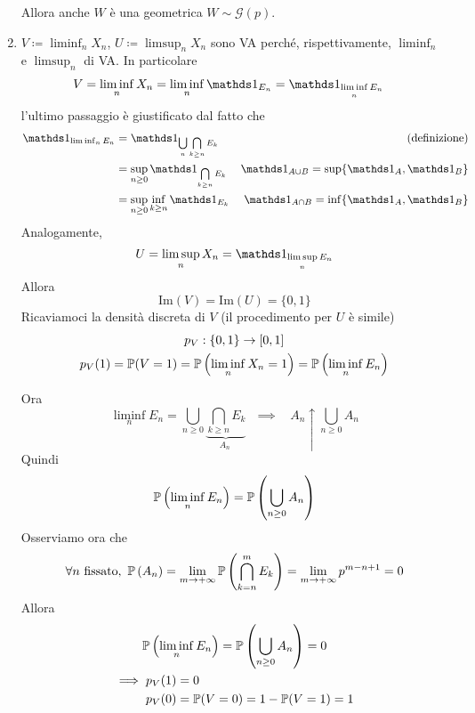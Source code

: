 \begin{enumerate}
Allora anche $W$ è una geometrica $W\sim \mathcal{G}( p)$.
\item $V\coloneqq \liminf _{n} X_{n}$, $U\coloneqq \limsup _{n} X_{n}$ sono VA perché, rispettivamente, $\liminf _{n}$ e $\limsup _{n}$ di VA. In particolare
\begin{align*}
V & =\liminf _{n} X_{n} =\liminf _{n}\Ind_{E_{n}} =\Ind_{\liminf\limits _{n} E_{n}}
\end{align*}
l'ultimo passaggio è giustificato dal fatto che
\begin{align*}
\Ind_{\liminf _{n} E_{n}} & =\Ind_{\bigcup\limits _{n}\bigcap\limits _{k\geq n} E_{k}} & \text{(definizione)}\\
 & =\sup\limits _{n\geq 0}\Ind_{\bigcap\limits _{k\geq n} E_{k}} & \Ind_{A\cup B} =\sup \{\Ind_{A} ,\Ind_{B}\}\\
 & =\sup _{n\geq 0}\inf_{k\geq n}\Ind_{E_{k}} & \Ind_{A\cap B} =\inf\{\Ind_{A} ,\Ind_{B}\}
\end{align*}
Analogamente,
\begin{equation*}
U=\limsup _{n} X_{n} =\Ind_{\limsup\limits _{n} E_{n}}
\end{equation*}
Allora
\begin{equation*}
\mathrm{Im}( V) =\mathrm{Im}( U) =\{0,1\}
\end{equation*}
Ricaviamoci la densità discreta di $V$ (il procedimento per $U$ è simile)
\begin{gather*}
p_{V} :\{0,1\}\rightarrow [ 0,1]\\
p_{V}( 1) =\mathbb{P}( V=1) =\mathbb{P}\left(\liminf _{n} X_{n} =1\right) =\mathbb{P}\left(\liminf _{n} E_{n}\right)
\end{gather*}

Ora
\begin{equation*}
\liminf _{n} E_{n} =\bigcup _{n\geq 0}\underbrace{\bigcap\limits _{k\geq n} E_{k}}_{A_{n} \ } \ \ \ \implies \ \ \ \ A_{n} \uparrow \bigcup _{n\geq 0} A_{n}
\end{equation*}
Quindi
\begin{equation*}
\mathbb{P}\left(\liminf _{n} E_{n}\right) =\mathbb{P}\left(\bigcup _{n\geq 0} A_{n}\right)
\end{equation*}
Osserviamo ora che
\begin{equation*}
\forall n\ \text{fissato} ,\ \mathbb{P}\left( A_{n}\right) =\lim _{m\rightarrow +\infty }\mathbb{P}\left(\bigcap\limits _{k=n}^{m} E_{k}\right) =\lim _{m\rightarrow +\infty } p^{m-n+1} =0
\end{equation*}
Allora
\begin{gather*}
\mathbb{P}\left(\liminf _{n} E_{n}\right) =\mathbb{P}\left(\bigcup _{n\geq 0} A_{n}\right) =0\\
\begin{aligned}
\implies p_{V}( 1) & =0\\
p_{V}( 0) & =\mathbb{P}( V=0) =1-\mathbb{P}( V=1) =1
\end{aligned}
\end{gather*}


\end{enumerate}
